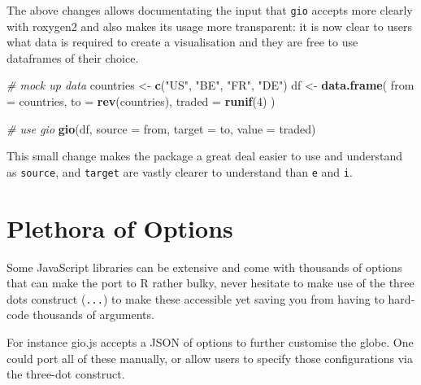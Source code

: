 \documentclass[
]{krantz}
\makeatletter
\newenvironment{Shaded}{\begin{snugshade}}{\end{snugshade}}
\newcommand{\CommentTok}[1]{\textcolor[rgb]{0.37,0.37,0.37}{\textit{#1}}}
\newcommand{\DataTypeTok}[1]{\textcolor[rgb]{0.27,0.27,0.27}{#1}}
\newcommand{\DecValTok}[1]{\textcolor[rgb]{0.06,0.06,0.06}{#1}}
\newcommand{\KeywordTok}[1]{\textcolor[rgb]{0.27,0.27,0.27}{\textbf{#1}}}
\newcommand{\NormalTok}[1]{#1}
\newcommand{\StringTok}[1]{\textcolor[rgb]{0.5,0.5,0.5}{#1}}
\newenvironment{kframe}{%
\medskip{}
\setlength{\fboxsep}{.8em}
 \def\at@end@of@kframe{}%
 \ifinner\ifhmode%
  \def\at@end@of@kframe{\end{minipage}}%
  \begin{minipage}{\columnwidth}%
 \fi\fi%
 \def\FrameCommand##1{\hskip\@totalleftmargin \hskip-\fboxsep
 \colorbox{shadecolor}{##1}\hskip-\fboxsep
     \hskip-\linewidth \hskip-\@totalleftmargin \hskip\columnwidth}%
 \MakeFramed {\advance\hsize-\width
   \@totalleftmargin\z@ \linewidth\hsize
   \@setminipage}}%
 {\par\unskip\endMakeFramed%
 \at@end@of@kframe}
\renewenvironment{Shaded}{\begin{kframe}}{\end{kframe}}
\makeatother
\begin{document}
The above changes allows documentating the input that \texttt{gio} accepts more clearly with roxygen2 and also makes its usage more transparent: it is now clear to users what data is required to create a visualisation and they are free to use dataframes of their choice.

\begin{Shaded}
\begin{Highlighting}[]
\CommentTok{\# mock up data}
\NormalTok{countries <{-}}\StringTok{ }\KeywordTok{c}\NormalTok{(}\StringTok{"US"}\NormalTok{, }\StringTok{"BE"}\NormalTok{, }\StringTok{"FR"}\NormalTok{, }\StringTok{"DE"}\NormalTok{)}
\NormalTok{df <{-}}\StringTok{ }\KeywordTok{data.frame}\NormalTok{(}
  \DataTypeTok{from =}\NormalTok{ countries,}
  \DataTypeTok{to =} \KeywordTok{rev}\NormalTok{(countries),}
  \DataTypeTok{traded =} \KeywordTok{runif}\NormalTok{(}\DecValTok{4}\NormalTok{)}
\NormalTok{)}

\CommentTok{\# use gio}
\KeywordTok{gio}\NormalTok{(df, }\DataTypeTok{source =}\NormalTok{ from, }\DataTypeTok{target =}\NormalTok{ to, }\DataTypeTok{value =}\NormalTok{ traded)}
\end{Highlighting}
\end{Shaded}

This small change makes the package a great deal easier to use and understand as \texttt{source}, and \texttt{target} are vastly clearer to understand than \texttt{e} and \texttt{i}.

\hypertarget{widgets-final-options}{%
\section{Plethora of Options}\label{widgets-final-options}}

Some JavaScript libraries can be extensive and come with thousands of options that can make the port to R rather bulky, never hesitate to make use of the three dots construct (\texttt{...}) to make these accessible yet saving you from having to hard-code thousands of arguments.

For instance gio.js accepts a JSON of options to further customise the globe. One could port all of these manually, or allow users to specify those configurations via the three-dot construct.
\end{document}
